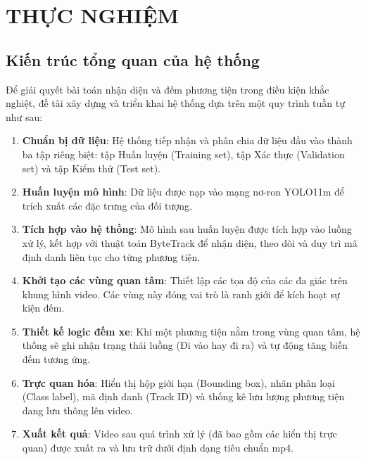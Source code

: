 
\chapter{THỰC NGHIỆM} %

\label{Chapter3} %


\section{Kiến trúc tổng quan của hệ thống}

Để giải quyết bài toán nhận diện và đếm phương tiện trong điều kiện khắc nghiệt, đề tài xây dựng và triển khai hệ thống dựa trên một quy trình tuần tự như sau:
\begin{enumerate}
	\item \textbf{Chuẩn bị dữ liệu}: Hệ thống tiếp nhận và phân chia dữ liệu đầu vào thành ba tập riêng biệt: tập Huấn luyện (Training set), tập Xác thực (Validation set) và tập Kiểm thử (Test set).
	
	\item \textbf{Huấn luyện mô hình}: Dữ liệu được nạp vào mạng nơ-ron YOLO11m để trích xuất các đặc trưng của đối tượng.
	
	\item \textbf{Tích hợp vào hệ thống}: Mô hình sau huấn luyện được tích hợp vào luồng xử lý, kết hợp với thuật toán ByteTrack để nhận diện, theo dõi và duy trì mã định danh liên tục cho từng phương tiện.
	
	\item \textbf{Khởi tạo các vùng quan tâm}: Thiết lập các tọa độ của các đa giác trên khung hình video. Các vùng này đóng vai trò là ranh giới để kích hoạt sự kiện đếm.
	
	\item \textbf{Thiết kế logic đếm xe}: Khi một phương tiện nằm trong vùng quan tâm, hệ thống sẽ ghi nhận trạng thái luồng (Đi vào hay đi ra) và tự động tăng biến đếm tương ứng.
	
	\item \textbf{Trực quan hóa}: Hiển thị hộp giới hạn (Bounding box), nhãn phân loại (Class label), mã định danh (Track ID) và thống kê lưu lượng phương tiện đang lưu thông lên video.
	
	\item \textbf{Xuất kết quả}: Video sau quá trình xử lý (đã bao gồm các hiển thị trực quan) được xuất ra và lưu trữ dưới định dạng tiêu chuẩn mp4.
\end{enumerate}

